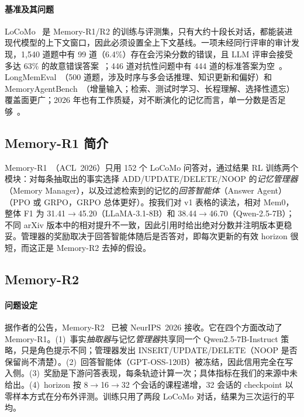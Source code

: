 \paragraph{基准及其问题}
LoCoMo~\citep{maharana2024evaluating} 是 Memory-R1/R2 的训练与评测集，只有大约十段长对话\unverified{}，都能装进现代模型的上下文窗口，因此必须设置全上下文基线。一项未经同行评审的审计发现，1{,}540 道题中有 99 道（6.4\%）存在会污染分数的错误，且 LLM 评审会接受多达 63\% 的故意错误答案~\citep{penfieldlocomo}；446 道对抗性问题中有 444 道的标准答案为空~\citep{atant2026}。LongMemEval~\citep{wu2024longmemeval}（500 道题，涉及时序与多会话推理、知识更新和偏好）和 MemoryAgentBench~\citep{hu2025evaluating}（增量输入；检索、测试时学习、长程理解、选择性遗忘）覆盖面更广；2026 年也有工作质疑，对不断演化的记忆而言，单一分数是否足够~\citep{onescore2026}。

\subsection{Memory-R1 简介}
Memory-R1~\citep{yan2025memory}（ACL~2026）只用 152 个 LoCoMo 问答对，通过结果 RL 训练两个模块：对每条抽取出的事实选择 ADD\slash UPDATE\slash DELETE\slash NOOP 的\emph{记忆管理器}（Memory Manager），以及过滤检索到的记忆的\emph{回答智能体}（Answer Agent）（PPO 或 GRPO，GRPO 总体更好）。按我们对 v1 表格的读法，相对 Mem0，整体 F1 为 31.41$\to$45.20（LLaMA-3.1-8B）和 38.44$\to$46.70（Qwen-2.5-7B）\unverified；不同 arXiv 版本中的相对提升不一致，因此引用时给出绝对分数并注明版本更稳妥。管理器的奖励取决于回答智能体随后是否答对\unverified，即每次更新的有效 horizon 很短，而这正是 Memory-R2 去掉的假设。

\subsection{Memory-R2}

\paragraph{问题设定}
据作者的公告，Memory-R2~\citep{yan2026memory} 已被 NeurIPS~2026 接收\unverified。它在四个方面改动了 Memory-R1。(1)~事实\emph{抽取器}与记忆\emph{管理器}共享同一个 Qwen2.5-7B-Instruct 策略，只是角色提示不同；管理器发出 INSERT\slash UPDATE\slash DELETE\unverified{}（NOOP 是否保留尚不清楚）。(2)~回答智能体（GPT-OSS-120B）被冻结\unverified，因此信用完全在写入侧。(3)~奖励是下游问答表现，每条轨迹计算一次；具体指标在我们的来源中未给出。(4)~horizon 按 8$\to$16$\to$32 个会话的课程递增，32 会话的 checkpoint 以零样本方式在分布外评测。训练只用了两段 LoCoMo 对话\unverified，结果为三次运行的平均\unverified。

